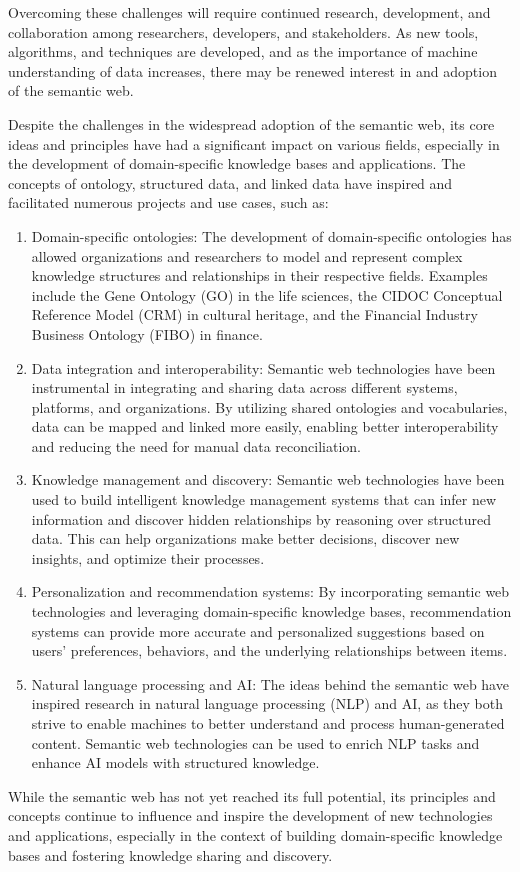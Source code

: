 \begin{mdframed}
Overcoming these challenges will require continued research, development, and collaboration among researchers, developers, and stakeholders. As new tools, algorithms, and techniques are developed, and as the importance of machine understanding of data increases, there may be renewed interest in and adoption of the semantic web.

Despite the challenges in the widespread adoption of the semantic web, its core ideas and principles have had a significant impact on various fields, especially in the development of domain-specific knowledge bases and applications. The concepts of ontology, structured data, and linked data have inspired and facilitated numerous projects and use cases, such as:

\begin{enumerate}
  \item Domain-specific ontologies: The development of domain-specific ontologies has allowed organizations and researchers to model and represent complex knowledge structures and relationships in their respective fields. Examples include the Gene Ontology (GO) in the life sciences, the CIDOC Conceptual Reference Model (CRM) in cultural heritage, and the Financial Industry Business Ontology (FIBO) in finance.
  \item Data integration and interoperability: Semantic web technologies have been instrumental in integrating and sharing data across different systems, platforms, and organizations. By utilizing shared ontologies and vocabularies, data can be mapped and linked more easily, enabling better interoperability and reducing the need for manual data reconciliation.
  \item Knowledge management and discovery: Semantic web technologies have been used to build intelligent knowledge management systems that can infer new information and discover hidden relationships by reasoning over structured data. This can help organizations make better decisions, discover new insights, and optimize their processes.
  \item Personalization and recommendation systems: By incorporating semantic web technologies and leveraging domain-specific knowledge bases, recommendation systems can provide more accurate and personalized suggestions based on users' preferences, behaviors, and the underlying relationships between items.
  \item Natural language processing and AI: The ideas behind the semantic web have inspired research in natural language processing (NLP) and AI, as they both strive to enable machines to better understand and process human-generated content. Semantic web technologies can be used to enrich NLP tasks and enhance AI models with structured knowledge.
\end{enumerate}

While the semantic web has not yet reached its full potential, its principles and concepts continue to influence and inspire the development of new technologies and applications, especially in the context of building domain-specific knowledge bases and fostering knowledge sharing and discovery.

\end{mdframed}

